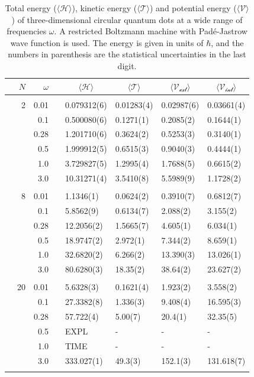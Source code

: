 \begin{table}
	\caption{Total energy ($\langle \mathcal{H}\rangle$), kinetic energy ($\langle\mathcal{T}\rangle$) and potential energy ($\langle \mathcal{V}\rangle$) of three-dimensional circular quantum dots at a wide range of frequencies $\omega$. A restricted Boltzmann machine with Padé-Jastrow wave function is used. The energy is given in units of $\hbar$, and the numbers in parenthesis are the statistical uncertainties in the last digit.}
	\label{tab:splitfrequencyQDRBMPJ3D}
	\begin{tabularx}{\textwidth}{R{1.5cm}rrcR{2.3cm}R{2.3cm}R{2.3cm}R{2.3cm}} \hline\hline
		& & $\omega$ &&  &  &  &  \\ \hline \\
		&2 & 0.01 && 0.079312(6) & 0.01283(4) & 0.02987(6) & 0.03661(4) \\
		&& 0.1 && 0.500080(6) & 0.1271(1) & 0.2085(2) & 0.1644(1) \\
		&& 0.28 && 1.201710(6) & 0.3624(2) & 0.5253(3) & 0.3140(1) \\
		&& 0.5 && 1.999912(5) & 0.6515(3) & 0.9040(3) & 0.4444(1) \\
		&& 1.0 && 3.729827(5) & 1.2995(4) & 1.7688(5) & 0.6615(2) \\
		&& 3.0 && 10.31271(4) & 3.5410(8) & 5.5989(9) & 1.1728(2) \\ \hdashline \\
		
		&8 & 0.01 && 1.1346(1) & 0.0624(2) & 0.3910(7) & 0.6812(7) \\
		&& 0.1 && 5.8562(9) & 0.6134(7) & 2.088(2) & 3.155(2) \\
		&& 0.28 && 12.2056(2) & 1.5665(7) & 4.605(1) & 6.034(1) \\
		&& 0.5 && 18.9747(2) & 2.972(1) & 7.344(2) & 8.659(1) \\
		&& 1.0 && 32.6820(2) & 6.266(2) & 13.390(3) & 13.026(1) \\
		&& 3.0 && 80.6280(3) & 18.35(2) & 38.64(2) & 23.627(2) \\ \hdashline \\
		
		&20 & 0.01 && 5.6328(3) & 0.1621(4) & 1.923(2) & 3.558(2) \\
		&& 0.1 && 27.3382(8) & 1.336(3) & 9.408(4) & 16.595(3) \\
		&& 0.28 && 57.722(4) & 5.00(7) & 20.4(1) & 32.35(5) \\
		&& 0.5 && EXPL & - & - & - \\
		&& 1.0 && TIME & - & - & - \\
		&& 3.0 && 333.027(1) & 49.3(3) & 152.1(3) & 131.618(7) \\ \hdashline \\
		

\end{tabularx}
\end{table}
